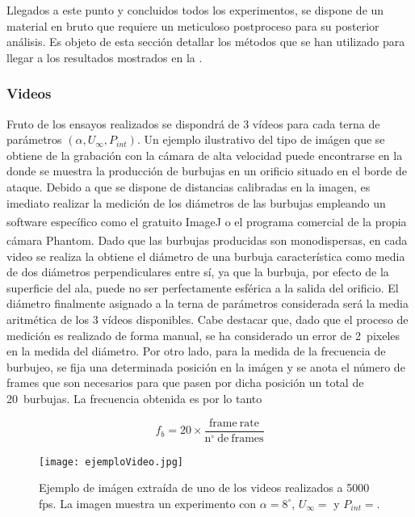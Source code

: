 Llegados a este punto y concluidos todos los experimentos, se dispone de un material en bruto que requiere un meticuloso postproceso para su posterior análisis. Es objeto de esta sección detallar los métodos que se han utilizado para llegar a los resultados mostrados en la . 

\subsubsection*{Videos}

Fruto de los ensayos realizados se dispondrá de 3 vídeos para cada terna de parámetros $\left(\alpha, U_{\infty}, P_{int}\right)$. Un ejemplo ilustrativo del tipo de imágen que se obtiene de la grabación con la cámara de alta velocidad puede encontrarse en la  donde se muestra la producción de burbujas en un orificio situado en el borde de ataque. Debido a que se dispone de distancias calibradas en la imagen, es imediato realizar la medición de los diámetros de las burbujas empleando un software específico como el gratuito ImageJ\textsuperscript{\textregistered} o el programa comercial de la propia cámara Phantom\textsuperscript{\textregistered}. Dado que las burbujas producidas son monodispersas, en cada video se realiza la obtiene el diámetro de una burbuja característica  como media de dos diámetros perpendiculares entre sí, ya que la burbuja, por efecto de la superficie del ala, puede no ser perfectamente esférica a la salida del orificio. El diámetro finalmente asignado a la terna de parámetros considerada será la media aritmética de los 3 vídeos disponibles. Cabe destacar que, dado que el proceso de medición es realizado de forma manual, se ha considerado un error de 2~pixeles en la medida del diámetro. Por otro lado, para la medida de la frecuencia de burbujeo, se fija una determinada posición en la imágen y se anota el número de frames que son necesarios para que pasen por dicha posición un total de 20~burbujas. La frecuencia obtenida es por lo tanto

\begin{equation}
f_{b} = 20 \times \dfrac{\mathrm{frame\ rate}}{\mathrm{n^{\circ}\ de\ frames}}
\end{equation}


\begin{figure}
\centering
\texttt{[image: ejemploVideo.jpg]}
\caption{Ejemplo de imágen extraída de uno de los videos realizados a 5000 fps. La imagen muestra un experimento con $\alpha = 8^{\circ}$, $U_{\infty} = $ y $P_{int} = $. %
}
\end{figure}

